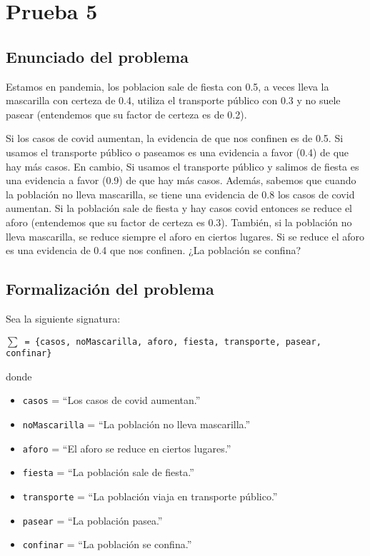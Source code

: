 \section{Prueba 5}
\subsection{Enunciado del problema}
Estamos en pandemia, los poblacion sale de fiesta con 0.5, a veces lleva la mascarilla con certeza de 0.4, utiliza el transporte público con 0.3 y no suele pasear (entendemos que su factor de certeza es de 0.2).
\par Si los casos de covid aumentan, la evidencia de que nos confinen es de 0.5. Si usamos el transporte público o paseamos es una evidencia a favor (0.4) de que hay más casos.
En cambio, Si usamos el transporte público y salimos de fiesta es una evidencia a favor (0.9) de que hay más casos.
Además, sabemos que cuando la población no lleva mascarilla, se tiene una evidencia de 0.8 los casos de covid aumentan. Si la población sale de fiesta  y hay casos covid entonces se reduce el aforo (entendemos que su factor de certeza es 0.3). 
También, si la población no lleva mascarilla, se reduce siempre el aforo en ciertos lugares. Si se reduce el aforo es una evidencia de 0.4 que nos confinen.
¿La población se confina?
\subsection{Formalización del problema}
\par Sea la siguiente signatura:
\par \texttt{$\sum$ = \{casos, noMascarilla, aforo, fiesta, transporte, pasear, confinar\} }
\par donde
\begin{itemize}
    \item \texttt{casos} = ``Los casos de covid aumentan.''
    \item \texttt{noMascarilla} = ``La población no lleva mascarilla.''
    \item \texttt{aforo} = ``El aforo se reduce en ciertos lugares.''
    \item \texttt{fiesta} = ``La población sale de fiesta.''
    \item \texttt{transporte} = ``La población viaja en transporte público.''
    \item \texttt{pasear} = ``La población pasea.''
    \item \texttt{confinar} = ``La población se confina.''
\end{itemize}


